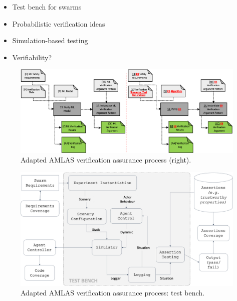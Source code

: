 \documentclass[lettersize,journal]{IEEEtran}
\begin{document}
\begin{itemize}
	\item Test bench for swarms
	\item Probabilistic verification ideas
	\item Simulation-based testing
	\item Verifiability?
\end{itemize}
\begin{figure}
	\centering
	\includegraphics[width=1.0\textwidth]{figures/amlas-a-stage5.png}
	\caption{Adapted AMLAS verification assurance process (right).}
	\label{amlas-a-stage5}
\end{figure}
\begin{figure}
	\centering
	\includegraphics[width=1.0\textwidth]{figures/verification-testbench.png}
	\caption{Adapted AMLAS verification assurance process: test bench.}
	\label{amlas-a-testbench}
\end{figure}
\end{document}
